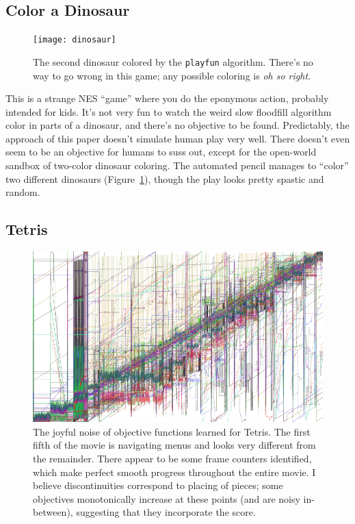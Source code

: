 \documentclass[twocolumn]{article}
\begin{document}
\subsection{Color a Dinosaur}

\begin{figure}[ht]
\begin{center}
\texttt{[image: dinosaur]}
\end{center}\vspace{-0.1in}
\caption{The second dinosaur colored by the {\tt playfun} algorithm.
  There's no way to go wrong in this game; any possible coloring is
  {\em oh so right}.}
\label{fig:dinosaur}
\end{figure}

This is a strange NES ``game'' where you do the eponymous action,
probably intended for kids. It's not very fun to watch the weird slow
floodfill algorithm color in parts of a dinosaur, and there's no
objective to be found. Predictably, the approach of this paper doesn't
simulate human play very well. There doesn't even seem to be an
objective for humans to suss out, except for the open-world sandbox of
two-color dinosaur coloring. The automated pencil manages to ``color''
two different dinosaurs (Figure~\ref{fig:dinosaur}), though the play
looks pretty spastic and random.

\subsection{Tetris}

\begin{figure}[ht]
\begin{center}
\includegraphics[width=0.95 \linewidth]{tetris}
\end{center}\vspace{-0.1in}
\caption{The joyful noise of objective functions learned for Tetris.
  The first fifth of the movie is navigating menus and looks very
  different from the remainder. There appear to be some frame counters
  identified, which make perfect smooth progress throughout the entire
  movie. I believe discontinuities correspond to placing of pieces;
  some objectives monotonically increase at these points (and are noisy
  in-between), suggesting that they incorporate the score.
}
\label{fig:tetris-objectives}
\end{figure}
\end{document}
